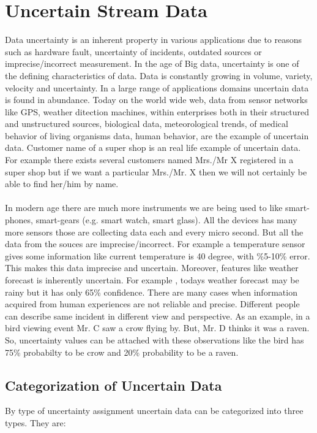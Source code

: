 \section{Uncertain Stream Data}
Data uncertainty is an inherent property in various applications due to reasons such as hardware fault, uncertainty of incidents, outdated sources or imprecise/incorrect measurement. In the age of Big data, uncertainty is one of the defining characteristics of data. Data is constantly growing in volume, variety, velocity and uncertainty. In a large range of applications domains uncertain data is found in abundance.  Today on the world wide web, data from sensor networks like GPS, weather ditection machines, within enterprises both in their structured and unstructured sources, biological data, meteorological trends, of medical behavior of living organisms data, human behavior, are the example of uncertain data. Customer name of a super shop is an real life example of uncertain data. For example there exists several customers named Mrs./Mr X registered in a super shop but if we want a particular Mrs./Mr. X then we will not certainly be able to find her/him by name.\\ \\
In modern age there are much more instruments we are being used to like smart-phones, smart-gears (e.g. smart watch, smart glass). All the devices has many more sensors those are collecting data each and every micro second. But all the data from the souces are imprecise/incorrect. For example a temperature sensor gives some information like current temperature is 40 degree, with \%5-10\% error. This makes this data imprecise and uncertain. Moreover, features like weather forecast is inherently uncertain. For example , todays weather forecast may be rainy but it has only 65\% confidence. There are many cases when information acquired from human experiences are not reliable and precise. Different people can describe same incident in different view and perspective. As an example, in a bird viewing event Mr. C saw a crow flying by. But, Mr. D thinks it was a raven. So, uncertainty values can be attached with these observations like the bird has 75\% probabilty to be crow and 20\% probability to be a raven.

\subsection{Categorization of Uncertain Data}
By type of uncertainty assignment uncertain data can be categorized into three types. They are:
